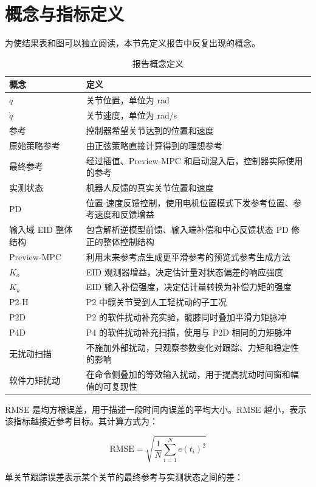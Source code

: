 \documentclass[12pt,a4paper]{ctexart}
\begin{document}
\section{概念与指标定义}


为使结果表和图可以独立阅读，本节先定义报告中反复出现的概念。

\begin{table}[htbp]
\centering
\footnotesize
\caption{报告概念定义}
\begin{tabularx}{\textwidth}{YY}
\toprule
概念 & 定义 \\
\midrule
$q$ & 关节位置，单位为 rad \\
$\dot q$ & 关节速度，单位为 rad/s \\
参考 & 控制器希望关节达到的位置和速度 \\
原始策略参考 & 由正弦策略直接计算得到的理想参考 \\
最终参考 & 经过插值、Preview-MPC 和启动混入后，控制器实际使用的参考 \\
实测状态 & 机器人反馈的真实关节位置和速度 \\
PD & 位置-速度反馈控制，使用电机位置模式下发参考位置、参考速度和反馈增益 \\
输入域 EID 整体结构 & 包含解析逆模型前馈、输入端补偿和中心反馈状态 PD 修正的整体控制结构 \\
Preview-MPC & 利用未来参考点生成更平滑参考的预览式参考生成方法 \\
$K_o$ & EID 观测器增益，决定估计量对状态偏差的响应强度 \\
$K_u$ & EID 输入补偿强度，决定估计量转换为补偿力矩的强度 \\
P2-H & P2 中髋关节受到人工轻扰动的子工况 \\
P2D & P2 的软件扰动补充实验，髋膝同时叠加平滑力矩脉冲 \\
P4D & P4 的软件扰动补充扫描，使用与 P2D 相同的力矩脉冲 \\
无扰动扫描 & 不施加外部扰动，只观察参数变化对跟踪、力矩和稳定性的影响 \\
软件力矩扰动 & 在命令侧叠加的等效输入扰动，用于提高扰动时间窗和幅值的可复现性 \\
\bottomrule
\end{tabularx}
\end{table}


RMSE 是均方根误差，用于描述一段时间内误差的平均大小。RMSE 越小，表示该指标越接近参考目标。其计算方式为：

\[
\mathrm{RMSE}=\sqrt{\frac{1}{N}\sum_{i=1}^{N}e(t_i)^2}
\]

单关节跟踪误差表示某个关节的最终参考与实测状态之间的差：
\end{document}
